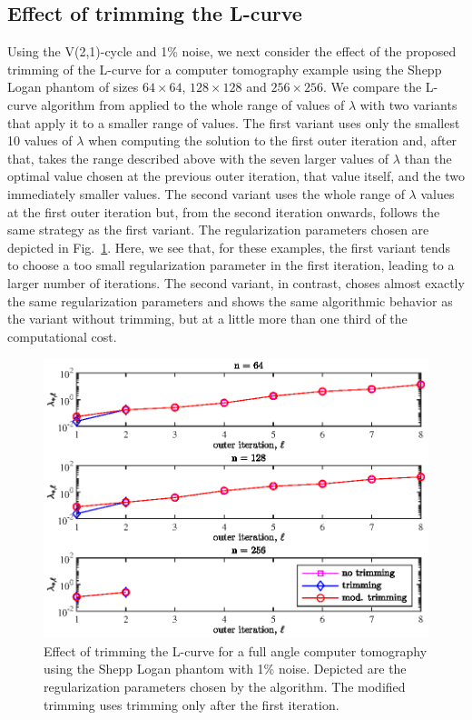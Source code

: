 \subsection{Effect of trimming the L-curve}
\label{ssec:trimming_numerical}
Using the V(2,1)-cycle and 1\% noise, we next consider the effect of the proposed trimming of the L-curve for a computer tomography example using the Shepp Logan phantom of sizes $64 \times 64$, $128 \times 128$ and $256 \times 256$. We compare the L-curve algorithm from \cite{OlearyHansen} applied to the whole range of values of $\lambda$ with two variants that apply it to a smaller range of values. The first variant uses only the smallest 10 values of $\lambda$ when computing the solution to the first outer iteration and, after that, takes the range described above with the seven larger values of $\lambda$ than the optimal value chosen at the previous outer iteration, that value itself, and the two immediately smaller values. The second variant uses the whole range of $\lambda$ values at the first outer iteration but, from the second iteration onwards, follows the same strategy as the first variant. The regularization parameters chosen are depicted in Fig.~\ref{fig:L-Curve_trimming}. Here, we see that, for these examples, the first variant tends to choose a too small regularization parameter in the first iteration, leading to a larger number of iterations. The second variant, in contrast, choses almost exactly the same regularization parameters and shows the same algorithmic behavior as the variant without trimming, but at a little more than one third of the computational cost.
\begin{figure}[htbp]
\begin{center}
\includegraphics{figures/L-Curve_trimming}
\caption{Effect of trimming the L-curve for a full angle computer tomography using the Shepp Logan phantom with 1\% noise. Depicted are the regularization parameters chosen by the algorithm. The modified trimming uses trimming only after the first iteration.}
\label{fig:L-Curve_trimming}
\end{center}
\end{figure}

